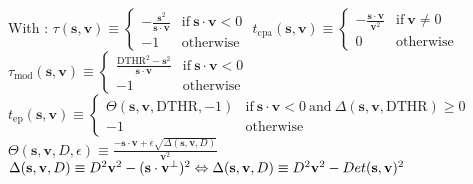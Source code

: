 With : \newline 
$\tau(\mathbf{s},\mathbf v) \equiv \left\{
\begin{array}{ll}
- \frac{\mathbf{s}^2}{\mathbf{s} \cdot \mathbf{v}} & \mathrm{if} ~ \mathbf{s} \cdot \mathbf{v} < 0\\
- 1  & \mathrm{otherwise}
\end{array}
\right. $\newline 
$t_{\mathrm{cpa}}(\mathbf{s},\mathbf v) \equiv \left\{
\begin{array}{ll}
- \frac{\mathbf{s} \cdot \mathbf{v}}{\mathbf{v}^2} & \mathrm{if} ~ \mathbf{v} \neq 0\\
0  & \mathrm{otherwise}
\end{array}
\right. $\newline 
$\tau_{\mathrm{mod}}(\mathbf{s},\mathbf v) \equiv \left\{
\begin{array}{ll}
\frac{\mathrm{DTHR}^2-\mathbf{s}^2}{\mathbf{s} \cdot \mathbf{v}} & \mathrm{if} ~ \mathbf{s} \cdot \mathbf{v} < 0\\
-1  & \mathrm{otherwise}
\end{array}
\right. $ \newline
$t_{\mathrm{ep}}(\mathbf{s},\mathbf v) \equiv \left\{
\begin{array}{ll}
\Theta (\mathbf{s},\mathbf{v}, \mathrm{DTHR}, -1) & \mathrm{if} ~ \mathbf{s} \cdot \mathbf{v} < 0 ~\mathrm{and}~ \Delta(\mathbf{s},\mathbf v, \mathrm{DTHR}) \ge 0\\
-1  & \mathrm{otherwise}
\end{array}
\right. $ \newline
$\Theta (\mathbf{s},\mathbf{v}, D, \epsilon) \equiv \frac{-\mathbf{s}\cdot\mathbf{v} + \epsilon \sqrt{\Delta(\mathbf{s},\mathbf{v},D)}}{\mathbf{v}^2}$\newline
$\Delta(\mathbf{s},\mathbf{v},D) \equiv D^2\mathbf{v}^2 - (\mathbf{s}\cdot\mathbf{v}^{\perp})^2 \\
\Leftrightarrow \Delta(\mathbf{s},\mathbf{v},D) \equiv D^2\mathbf{v}^2 - Det(\mathbf{s},\mathbf{v})^2$
